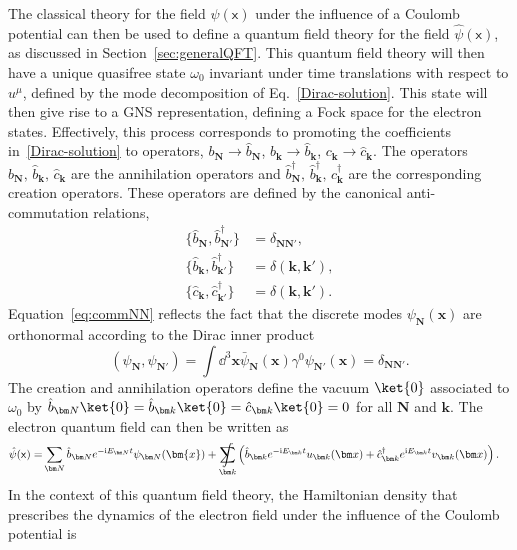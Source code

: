 \documentclass[letterpaper,12pt,titlepage,oneside,final]{book}
\newcommand{\mf}{\mathsf}%
\newcommand{\ii}{\mathrm{i}}
\DeclareMathOperator*{\sumint}{%
\mathchoice%
  {\ooalign{$\displaystyle\sum$\cr\hidewidth$\displaystyle\int$\hidewidth\cr}}
  {\ooalign{\raisebox{.14\height}{\scalebox{.7}{$\textstyle\sum$}}\cr\hidewidth$\textstyle\int$\hidewidth\cr}}
  {\ooalign{\raisebox{.2\height}{\scalebox{.6}{$\scriptstyle\sum$}}\cr$\scriptstyle\int$\cr}}
  {\ooalign{\raisebox{.2\height}{\scalebox{.6}{$\scriptstyle\sum$}}\cr$\scriptstyle\int$\cr}}
}
\begin{document}
The classical theory for the field $\psi(\mf x)$ under the influence of a Coulomb potential can then be used to define a quantum field theory for the field $\hat{\psi}(\mf x)$, as discussed in Section~\ref{sec:generalQFT}. This quantum field theory will then have a unique quasifree state $\omega_0$ invariant under time translations with respect to $u^\mu$, defined by the mode decomposition of Eq.~\eqref{Dirac-solution}. This state will then give rise to a GNS representation, defining a Fock space for the electron states. Effectively, this process corresponds to promoting the coefficients in~\eqref{Dirac-solution} to operators, \mbox{$b_{\bm N}\rightarrow\hat{b}_{\bm N}$}, \mbox{$b_{\bm k}\rightarrow\hat{b}_{\bm k}$}, \mbox{$c_{\bm k}\rightarrow\hat{c}_{\bm k}$}. The operators $\hat{b}_{\bm N},\, \hat{b}_{\bm k},\, \hat{c}_{\bm k}$ are the annihilation operators and $\hat{b}^\dagger_{\bm N},\, \hat{b}^\dagger_{\bm k},\, \hat{c}^\dagger_{\bm k}$ are the corresponding creation operators. These operators are defined by the canonical anti-commutation relations,
\begin{align}
    \{\hat{b}_{\bm N}, \hat{b}^\dagger_{\bm N'}\} &= \delta_{\bm{NN}'},\label{eq:commNN}\\
    \{\hat{b}_{\bm k}, \hat{b}^\dagger_{\bm k'}\} &= \delta(\bm k,\bm k'),\\
    \{\hat{c}_{\bm k}, \hat{c}^\dagger_{\bm k'}\} &= \delta(\bm k,\bm k').
\end{align} 
Equation~\eqref{eq:commNN} reflects the fact that the discrete modes $\psi_{\bm N}(\bm x)$ are orthonormal according to the Dirac inner product
\begin{equation}
    (\psi_{\bm N}, \psi_{\bm N'}) = \int \dd^3 \bm x \bar{\psi}_{\bm N}(\bm x) \gamma^0 \psi_{\bm N'}(\bm x)  = \delta_{\bm N \bm N'}.
\end{equation}
The creation and annihilation operators define the vacuum $\ket{0}$ associated to $\omega_0$ by $\hat{b}_{\bm N} \ket{0} = \hat{b}_{\bm k} \ket{0} = \hat{c}_{\bm k} \ket{0} = 0$ for all $\bm N$ and $\bm k$. The electron quantum field can then be written as
\begin{align}\label{psi-general}
    \hat{\psi}(\mf x) = &\sum_{\bm N} \hat{b}_{\bm N} e^{-\ii E_{\bm N}t}\psi_{\bm N}(\bm{x})+ \sumint_{\bm k} \left( \hat{b}_{\bm k} e^{- \ii E_{\bm k} t} u_{\bm k}(\bm x) + \hat{c}^\dagger_{\bm k} e^{\ii E_{\bm k} t} v_{\bm k}(\bm x)\right).
\end{align}
In the context of this quantum field theory, the Hamiltonian density that prescribes the dynamics of the electron field under the influence of the Coulomb potential is
\end{document}
